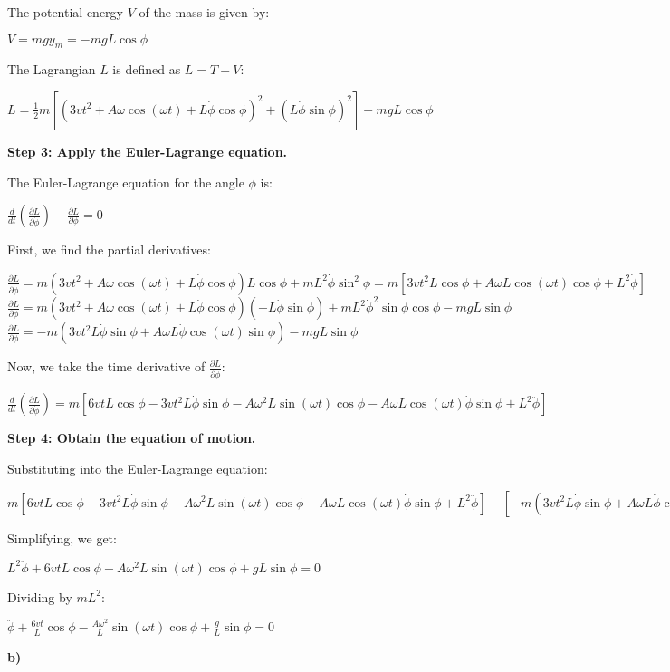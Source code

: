 \documentclass{article}
\begin{document}
The potential energy $V$ of the mass is given by:

$V = mgy_m = -mgL\cos\phi$

The Lagrangian $L$ is defined as $L = T - V$:

$L = \frac{1}{2}m[(3vt^2 + A\omega\cos(\omega t) + L\dot{\phi}\cos\phi)^2 + (L\dot{\phi}\sin\phi)^2] + mgL\cos\phi$

\textbf{Step 3: Apply the Euler-Lagrange equation.}

The Euler-Lagrange equation for the angle $\phi$ is:

$\frac{d}{dt}\left(\frac{\partial L}{\partial \dot{\phi}}\right) - \frac{\partial L}{\partial \phi} = 0$

First, we find the partial derivatives:

$\frac{\partial L}{\partial \dot{\phi}} = m(3vt^2 + A\omega\cos(\omega t) + L\dot{\phi}\cos\phi)L\cos\phi + mL^2\dot{\phi}\sin^2\phi = m[3vt^2L\cos\phi + A\omega L \cos(\omega t)\cos\phi + L^2\dot{\phi}]$
$\frac{\partial L}{\partial \phi} = m(3vt^2 + A\omega\cos(\omega t) + L\dot{\phi}\cos\phi)(-L\dot{\phi}\sin\phi) + mL^2\dot{\phi}^2\sin\phi\cos\phi - mgL\sin\phi$
$\frac{\partial L}{\partial \phi} = -m(3vt^2L\dot{\phi}\sin\phi + A\omega L\dot{\phi}\cos(\omega t)\sin\phi) -mgL\sin\phi$

Now, we take the time derivative of $\frac{\partial L}{\partial \dot{\phi}}$:

$\frac{d}{dt}\left(\frac{\partial L}{\partial \dot{\phi}}\right) = m[6vtL\cos\phi - 3vt^2L\dot{\phi}\sin\phi - A\omega^2 L \sin(\omega t)\cos\phi - A\omega L \cos(\omega t)\dot{\phi}\sin\phi + L^2\ddot{\phi}]$

\textbf{Step 4: Obtain the equation of motion.}

Substituting into the Euler-Lagrange equation:

$m[6vtL\cos\phi - 3vt^2L\dot{\phi}\sin\phi - A\omega^2 L \sin(\omega t)\cos\phi - A\omega L \cos(\omega t)\dot{\phi}\sin\phi + L^2\ddot{\phi}] - [-m(3vt^2L\dot{\phi}\sin\phi + A\omega L\dot{\phi}\cos(\omega t)\sin\phi) -mgL\sin\phi] = 0$

Simplifying, we get:

$L^2\ddot{\phi} + 6vtL\cos\phi - A\omega^2 L \sin(\omega t)\cos\phi + gL\sin\phi = 0$

Dividing by $mL^2$:

$\ddot{\phi} + \frac{6vt}{L}\cos\phi - \frac{A\omega^2}{L} \sin(\omega t)\cos\phi + \frac{g}{L}\sin\phi = 0$

\textbf{b)}
\end{document}
